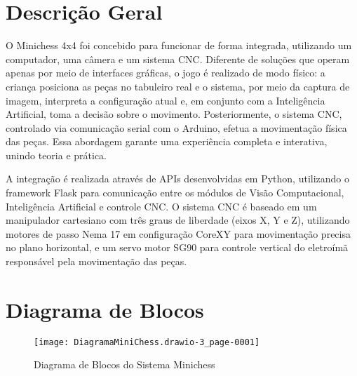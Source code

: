 \documentclass[a4paper,12pt]{article}
\begin{document}
\section{Descrição Geral}
O Minichess 4x4 foi concebido para funcionar de forma integrada, utilizando um computador, uma câmera e um sistema CNC. Diferente de soluções que operam apenas por meio de interfaces gráficas, o jogo é realizado de modo físico: a criança posiciona as peças no tabuleiro real e o sistema, por meio da captura de imagem, interpreta a configuração atual e, em conjunto com a Inteligência Artificial, toma a decisão sobre o movimento. Posteriormente, o sistema CNC, controlado via comunicação serial com o Arduino, efetua a movimentação física das peças. Essa abordagem garante uma experiência completa e interativa, unindo teoria e prática. 

A integração é realizada através de APIs desenvolvidas em Python, utilizando o framework Flask para comunicação entre os módulos de Visão Computacional, Inteligência Artificial e controle CNC. O sistema CNC é baseado em um manipulador cartesiano com três graus de liberdade (eixos X, Y e Z), utilizando motores de passo Nema 17 em configuração CoreXY para movimentação precisa no plano horizontal, e um servo motor SG90 para controle vertical do eletroímã responsável pela movimentação das peças.

\section{Diagrama de Blocos}
\begin{figure}[H]
    \centering
    \texttt{[image: DiagramaMiniChess.drawio-3\_page-0001]} %
    \caption{Diagrama de Blocos do Sistema Minichess}
    \label{fig:diagrama}
\end{figure}

\clearpage
\vspace{1em}
\end{document}
